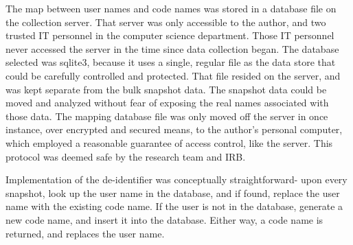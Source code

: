 The map between user names and code names was stored in a database file on the collection server. That server was only accessible to the author, and two trusted IT personnel in the computer science department. Those IT personnel never accessed the server in the time since data collection began. The database selected was sqlite3, because it uses a single, regular file as the data store that could be carefully controlled and protected. That file resided on the server, and was kept separate from the bulk snapshot data. The snapshot data could be moved and analyzed without fear of exposing the real names associated with those data. The mapping database file was only moved off the server in once instance, over encrypted and secured means, to the author's personal computer, which employed a reasonable guarantee of access control, like the server. This protocol was deemed safe by the research team and IRB.

Implementation of the de-identifier was conceptually straightforward- upon every snapshot, look up the user name in the database, and if found, replace the user name with the existing code name. If the user is not in the database, generate a new code name, and insert it into the database. Either way, a code name is returned, and replaces the user name. 



